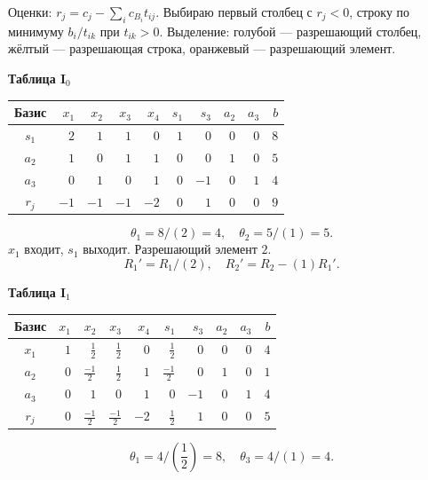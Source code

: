 \documentclass[12pt,a4paper]{article}
\begin{document}
Оценки: $r_j=c_j-\sum_i c_{B_i}t_{ij}$.
Выбираю первый столбец с $r_j<0$, строку по минимуму $b_i/t_{ik}$ при $t_{ik}>0$.
Выделение: голубой — разрешающий столбец, жёлтый — разрешающая строка, оранжевый — разрешающий элемент.
\par\textbf{Таблица I$_{0}$}\begin{center}\small\setlength{\tabcolsep}{4pt}\begin{tabular}{c|rrrrrrrr|r}\hline
Базис & \cellcolor{cyan!18}$x_{1}$ & $x_{2}$ & $x_{3}$ & $x_{4}$ & $s_{1}$ & $s_{3}$ & $a_{2}$ & $a_{3}$ & $b$\\\hline
\rowcolor{yellow!25}$s_{1}$ & \cellcolor{orange!45}$2$ & $1$ & $1$ & $0$ & $1$ & $0$ & $0$ & $0$ & $8$\\
$a_{2}$ & \cellcolor{cyan!18}$1$ & $0$ & $1$ & $1$ & $0$ & $0$ & $1$ & $0$ & $5$\\
$a_{3}$ & \cellcolor{cyan!18}$0$ & $1$ & $0$ & $1$ & $0$ & $-1$ & $0$ & $1$ & $4$\\
\hline $r_j$ & \cellcolor{cyan!18}$-1$ & $-1$ & $-1$ & $-2$ & $0$ & $1$ & $0$ & $0$ & $9$\\\hline\end{tabular}\end{center}
\[\theta_{1}=8/(2)=4,\quad \theta_{2}=5/(1)=5.\]
$x_{1}$ входит, $s_{1}$ выходит. Разрешающий элемент $2$.
{\small\[R_{1}'=R_{1}/(2),\quad R_{2}'=R_{2}-(1)R_{1}'.\]}
\newpage
\par\textbf{Таблица I$_{1}$}\begin{center}\small\setlength{\tabcolsep}{4pt}\begin{tabular}{c|rrrrrrrr|r}\hline
Базис & $x_{1}$ & \cellcolor{cyan!18}$x_{2}$ & $x_{3}$ & $x_{4}$ & $s_{1}$ & $s_{3}$ & $a_{2}$ & $a_{3}$ & $b$\\\hline
$x_{1}$ & $1$ & \cellcolor{cyan!18}$\frac{1}{2}$ & $\frac{1}{2}$ & $0$ & $\frac{1}{2}$ & $0$ & $0$ & $0$ & $4$\\
$a_{2}$ & $0$ & \cellcolor{cyan!18}$\frac{-1}{2}$ & $\frac{1}{2}$ & $1$ & $\frac{-1}{2}$ & $0$ & $1$ & $0$ & $1$\\
\rowcolor{yellow!25}$a_{3}$ & $0$ & \cellcolor{orange!45}$1$ & $0$ & $1$ & $0$ & $-1$ & $0$ & $1$ & $4$\\
\hline $r_j$ & $0$ & \cellcolor{cyan!18}$\frac{-1}{2}$ & $\frac{-1}{2}$ & $-2$ & $\frac{1}{2}$ & $1$ & $0$ & $0$ & $5$\\\hline\end{tabular}\end{center}
\[\theta_{1}=4/(\frac{1}{2})=8,\quad \theta_{3}=4/(1)=4.\]
\end{document}
